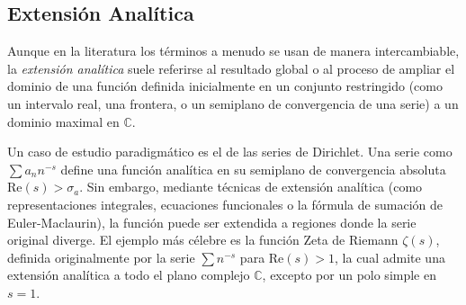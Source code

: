 \documentclass[a4paper]{article}
\begin{document}
\subsection*{Extensión Analítica}
Aunque en la literatura los términos a menudo se usan de manera intercambiable, la \textit{extensión analítica} suele referirse al resultado global o al proceso de ampliar el dominio de una función definida inicialmente en un conjunto restringido (como un intervalo real, una frontera, o un semiplano de convergencia de una serie) a un dominio maximal en $\mathbb{C}$.

Un caso de estudio paradigmático es el de las series de Dirichlet. Una serie como $\sum a_n n^{-s}$ define una función analítica en su semiplano de convergencia absoluta $\text{Re}(s) > \sigma_a$. Sin embargo, mediante técnicas de extensión analítica (como representaciones integrales, ecuaciones funcionales o la fórmula de sumación de Euler-Maclaurin), la función puede ser extendida a regiones donde la serie original diverge. El ejemplo más célebre es la función Zeta de Riemann $\zeta(s)$, definida originalmente por la serie $\sum n^{-s}$ para $\text{Re}(s) > 1$, la cual admite una extensión analítica a todo el plano complejo $\mathbb{C}$, excepto por un polo simple en $s = 1$.
\end{document}
